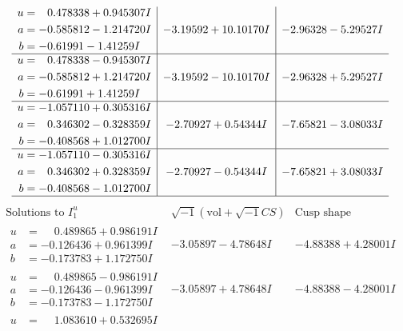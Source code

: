 \documentclass[1p]{elsarticle_modified}
\theoremstyle{definition}
\newcommand{\I}{\sqrt{-1}}
\begin{document}
$$\begin{array}{c|c|c}
\begin{aligned}
u &= \phantom{-}0.478338 + 0.945307 I \\
a &= -0.585812 - 1.214720 I \\
b &= -0.61991 - 1.41259 I\end{aligned}
 & -3.19592 + 10.10170 I & -2.96328 - 5.29527 I \\ \hline\begin{aligned}
u &= \phantom{-}0.478338 - 0.945307 I \\
a &= -0.585812 + 1.214720 I \\
b &= -0.61991 + 1.41259 I\end{aligned}
 & -3.19592 - 10.10170 I & -2.96328 + 5.29527 I \\ \hline\begin{aligned}
u &= -1.057110 + 0.305316 I \\
a &= \phantom{-}0.346302 - 0.328359 I \\
b &= -0.408568 + 1.012700 I\end{aligned}
 & -2.70927 + 0.54344 I & -7.65821 - 3.08033 I \\ \hline\begin{aligned}
u &= -1.057110 - 0.305316 I \\
a &= \phantom{-}0.346302 + 0.328359 I \\
b &= -0.408568 - 1.012700 I\end{aligned}
 & -2.70927 - 0.54344 I & -7.65821 + 3.08033 I\\
 \hline 
 \end{array}$$\newpage$$\begin{array}{c|c|c}  
\text{Solutions to }I^u_{1}& \I (\text{vol} + \sqrt{-1}CS) & \text{Cusp shape}\\
 \hline 
\begin{aligned}
u &= \phantom{-}0.489865 + 0.986191 I \\
a &= -0.126436 + 0.961399 I \\
b &= -0.173783 + 1.172750 I\end{aligned}
 & -3.05897 - 4.78648 I & -4.88388 + 4.28001 I \\ \hline\begin{aligned}
u &= \phantom{-}0.489865 - 0.986191 I \\
a &= -0.126436 - 0.961399 I \\
b &= -0.173783 - 1.172750 I\end{aligned}
 & -3.05897 + 4.78648 I & -4.88388 - 4.28001 I \\ \hline\begin{aligned}
u &= \phantom{-}1.083610 + 0.532695 I \\

\end{aligned}
\end{array}$$
\end{document}
